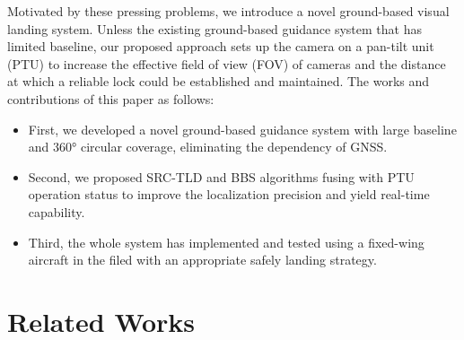 Motivated by these pressing problems, we introduce a novel ground-based visual landing system. Unless the existing ground-based guidance system that has limited baseline, our proposed approach sets up the camera on a pan-tilt unit (PTU) to increase the effective field of view (FOV) of cameras and the distance at which a reliable lock could be established and maintained. The works and contributions of this paper as follows:
\begin{itemize}
	\item First, we developed a novel ground-based guidance system with large baseline and 360° circular coverage, eliminating the dependency of GNSS.
	\item Second, we proposed SRC-TLD and BBS algorithms fusing with PTU operation status to improve the localization precision and yield real-time capability.
	\item Third, the whole system has implemented and tested using a fixed-wing aircraft in the filed with an appropriate safely landing strategy.
\end{itemize}



\section{Related Works}

%
%


